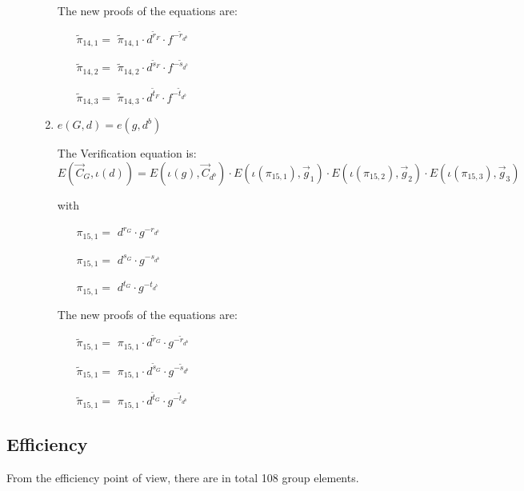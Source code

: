 \begin{description}
\begin{enumerate}
    The new proofs of the equations are:
    \begin{itemize}
    \item[$\tilde{\pi}_{14,1} = $] $\tilde{\pi}_{14,1} \cdot d^{\tilde{r}_F} \cdot f^{-\tilde{r}_{d^b}}$    
    \item[$\tilde{\pi}_{14,2} = $] $\tilde{\pi}_{14,2} \cdot d^{\tilde{s}_F} \cdot f^{-\tilde{s}_{d^b}}$    
    \item[$\tilde{\pi}_{14,3} = $] $\tilde{\pi}_{14,3} \cdot d^{\tilde{t}_F} \cdot f^{-\tilde{t}_{d^b}}$
    \end{itemize}


  \item \label{relationgd}
    $e(\boxed{G},d) = e(g, \boxed{d^b})$

    The Verification equation is: $E(\vec{C}_G, \iota(d)) = E(\iota(g), \vec{C}_{d^b}) \cdot E(\iota(\pi_{15,1}), \vec{g}_1)\cdot E(\iota(\pi_{15,2}), \vec{g}_2)\cdot E(\iota(\pi_{15,3}), \vec{g}_3)$

    with

    \begin{itemize}
    \item[$\pi_{15,1} = $] $d^{r_G} \cdot g^{-r_{d^b}}$    
    \item[$\pi_{15,1} = $] $d^{s_G} \cdot g^{-s_{d^b}}$    
    \item[$\pi_{15,1} = $] $d^{t_G} \cdot g^{-t_{d^b}}$
    \end{itemize}

    The new proofs of the equations are:
    
    \begin{itemize}
    \item[$\tilde{\pi}_{15,1} = $] $\pi_{15,1} \cdot d^{\tilde{r}_G} \cdot g^{-\tilde{r}_{d^b}}$    
    \item[$\tilde{\pi}_{15,1} = $] $\pi_{15,1} \cdot d^{\tilde{s}_G} \cdot g^{-\tilde{s}_{d^b}}$    
    \item[$\tilde{\pi}_{15,1} = $] $\pi_{15,1} \cdot d^{\tilde{t}_G} \cdot g^{-\tilde{t}_{d^b}}$
    \end{itemize}

    
  \end{enumerate}
\end{description}

\subsection{Efficiency}
From the efficiency point of view, there are in total 108 group elements.

